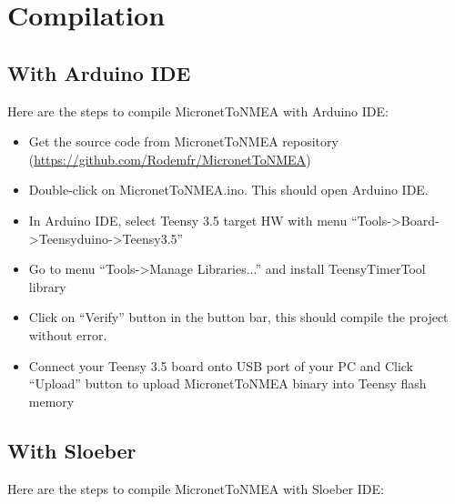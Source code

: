 \documentclass{report}
\begin{document}
\chapter{Compilation}

\section{With Arduino IDE}

Here are the steps to compile MicronetToNMEA with Arduino IDE:

\begin{itemize}
\item Get the source code from MicronetToNMEA repository (\url{https://github.com/Rodemfr/MicronetToNMEA})
\item Double-click on MicronetToNMEA.ino. This should open Arduino IDE.
\item In Arduino IDE, select Teensy 3.5 target HW with menu “Tools->Board->Teensyduino->Teensy3.5”
\item Go to menu “Tools->Manage Libraries...” and install TeensyTimerTool library
\item Click on “Verify” button in the button bar, this should compile the project without error.
\item Connect your Teensy 3.5 board onto USB port of your PC and Click “Upload” button to upload MicronetToNMEA binary into Teensy flash memory
\end{itemize}

\section{With Sloeber}

Here are the steps to compile MicronetToNMEA with Sloeber IDE:
\end{document}
